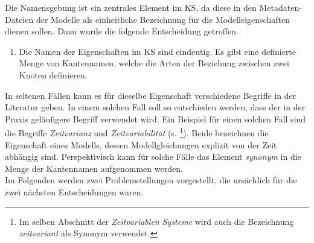 Die Namensgebung ist ein zentrales Element im KS, da diese in den Metadaten-Dateien der Modelle als einheitliche Bezeichnung für die Modelleigenschaften dienen sollen. Dazu wurde die folgende Entscheidung getroffen.
\begin{enumerate}[resume*]
	\item \label{E.KS_Namensgebung}Die Namen der Eigenschaften im KS sind eindeutig. Es gibt eine definierte Menge von Kantennamen, welche die Arten der Beziehung zwischen zwei Knoten definieren.
\end{enumerate}
In seltenen Fällen kann es für dieselbe Eigenschaft verschiedene Begriffe in der Literatur geben. In einem solchen Fall soll so entschieden werden, dass der in der Praxis geläufigere Begriff verwendet wird. Ein Beispiel für einen solchen Fall sind die Begriffe \textit{Zeitvarianz} und \textit{Zeitvariabilität} (s. \cite[S. 114]{LUN10}\footnote{Im selben Abschnitt der \textit{Zeitvariablen Systeme} wird auch die Bezeichnung \textit{zeitvariant} als Synonym verwendet.}). Beide bezeichnen die Eigenschaft eines Modells, dessen Modellgleichungen explizit von der Zeit abhängig sind. Perspektivisch kann für solche Fälle das Element \textit{synonym} in die Menge der Kantennamen aufgenommen werden.\\
Im Folgenden werden zwei Problemstellungen vorgestellt, die ursächlich für die zwei nächsten Entscheidungen waren.

